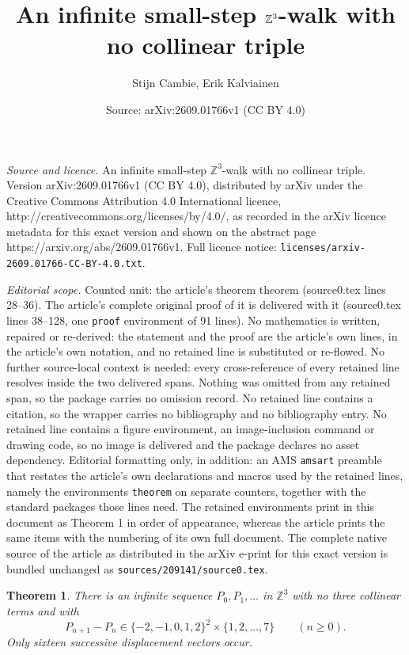 \documentclass[10pt,a4paper]{amsart}
\title{An infinite small-step $\Z^3$-walk with no collinear triple}
\author{Stijn Cambie, Erik Kalviainen}
\date{Source: arXiv:2609.01766v1 (CC BY 4.0)}
\newtheorem{theorem}{Theorem}
\newcommand{\Z}{\mathbb Z}
\begin{document}
\maketitle

\noindent\emph{Source and licence.} An infinite small-step $\Z^3$-walk with no collinear triple. Version arXiv:2609.01766v1 (CC BY 4.0), distributed by arXiv under the Creative Commons Attribution 4.0 International licence, http://creativecommons.org/licenses/by/4.0/, as recorded in the arXiv licence metadata for this exact version and shown on the abstract page https://arxiv.org/abs/2609.01766v1. Full licence notice: \texttt{licenses/arxiv-2609.01766-CC-BY-4.0.txt}.\par\smallskip

\noindent\textit{Editorial scope.} Counted unit: the article's theorem theorem (source0.tex lines 28--36). The article's complete original proof of it is delivered with it (source0.tex lines 38--128, one \texttt{proof} environment of 91 lines). No mathematics is written, repaired or re-derived: the statement and the proof are the article's own lines, in the article's own notation, and no retained line is substituted or re-flowed.  No further source-local context is needed: every cross-reference of every retained line resolves inside the two delivered spans.  Nothing was omitted from any retained span, so the package carries no omission record.  No retained line contains a citation, so the wrapper carries no bibliography and no bibliography entry.  No retained line contains a figure environment, an image-inclusion command or drawing code, so no image is delivered and the package declares no asset dependency.  Editorial formatting only, in addition: an AMS \texttt{amsart} preamble that restates the article's own declarations and macros used by the retained lines, namely the environments \texttt{theorem} on separate counters, together with the standard packages those lines need.  The retained environments print in this document as Theorem 1 in order of appearance, whereas the article prints the same items with the numbering of its own full document.  The complete native source of the article as distributed in the arXiv e-print for this exact version is bundled unchanged as \texttt{sources/209141/source0.tex}.
\begin{theorem}
There is an infinite sequence $P_0,P_1,\ldots$ in $\Z^3$ with no three
collinear terms and with
\[
 P_{n+1}-P_n\in\{-2,-1,0,1,2\}^2\times\{1,2,\ldots,7\}
 \qquad(n\geq0).
\]
Only sixteen successive displacement vectors occur.
\end{theorem}
\end{document}
